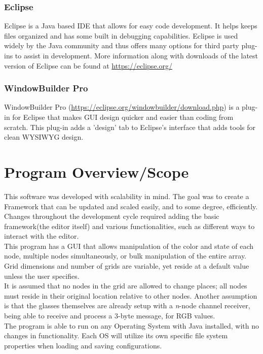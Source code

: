 \documentclass[12pt]{article}
\begin{document}
		\subsubsection{Eclipse}
  		Eclipse is a Java based IDE that allows for easy code development. It helps keeps files organized and has some built in debugging capabilities. Eclipse is used widely by the Java community and thus offers many options for third party plug-ins to assist in development. More information along with downloads of the latest version of Eclipse can be found at \url{https://eclipse.org/}
		
		\subsubsection{WindowBuilder Pro}
  		WindowBuilder Pro (\url{https://eclipse.org/windowbuilder/download.php}) is a plug-in for Eclipse that makes GUI design quicker and easier than coding from scratch. This plug-in adds a 'design' tab to Eclipse's interface that adds tools for clean WYSIWYG design. 
		
\newpage
	\section{Program Overview/Scope}
  	This software was developed with scalability in mind. The goal was to create a Framework that can be updated and scaled easily, and to some degree, efficiently. Changes throughout the development cycle required adding the basic framework(the editor itself) and various functionalities, such as different ways to interact with the editor. \\
    This program has a GUI that allows manipulation of the color and state of each node, multiple nodes simultaneously, or bulk manipulation of the entire array. Grid dimensions and number of grids are variable, yet reside at a default value unless the user specifies. \\
    It is assumed that no nodes in the grid are allowed to change places; all nodes must reside in their original location relative to other nodes. Another assumption is that the glasses themselves are already setup with a \textit{n}-node channel receiver, being able to receive and process a $3$-byte message, for RGB values.\\
    The program is able to run on any Operating System with Java installed, with no changes in functionality. Each OS will utilize its own specific file system properties when loading and saving configurations.
	
\end{document}
